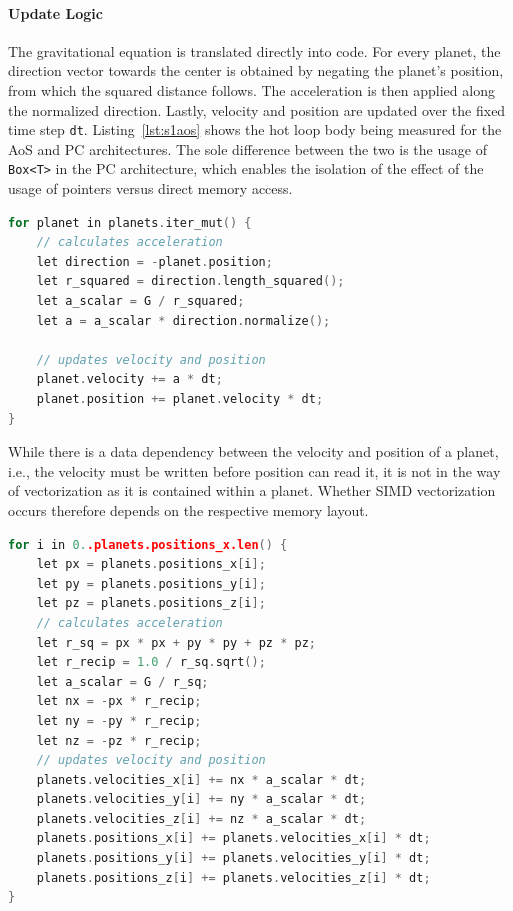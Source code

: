 \paragraph{Update Logic}
The gravitational equation is translated directly into code. For every planet, the direction vector towards the center is obtained by negating the planet's position, from which the squared distance follows. The acceleration is then applied along the normalized direction. Lastly, velocity and position are updated over the fixed time step \texttt{dt}. Listing~\ref{lst:s1aos} shows the hot loop body being measured for the \ac{AoS} and \ac{PC} architectures. The sole difference between the two is the usage of \texttt{Box<T>} in the \ac{PC} architecture, which enables the isolation of the effect of the usage of pointers versus direct memory access. 

\begin{lstlisting}[language=C++, caption={Update loop of the AoS and PC architectures}, label={lst:s1aos}]
for planet in planets.iter_mut() {
    // calculates acceleration
    let direction = -planet.position;
    let r_squared = direction.length_squared();
    let a_scalar = G / r_squared;
    let a = a_scalar * direction.normalize();

    // updates velocity and position
    planet.velocity += a * dt;
    planet.position += planet.velocity * dt;
}
\end{lstlisting}

While there is a data dependency between the velocity and position of a planet, i.e., the velocity must be written before position can read it, it is not in the way of vectorization as it is contained within a planet. Whether \ac{SIMD} vectorization occurs therefore depends on the respective memory layout. 

\clearpage
\begin{lstlisting}[language=C++, caption={Update loop of the SoA architecture}, label={lst:s1soa}]
for i in 0..planets.positions_x.len() {
    let px = planets.positions_x[i];
    let py = planets.positions_y[i];
    let pz = planets.positions_z[i];
    // calculates acceleration
    let r_sq = px * px + py * py + pz * pz;
    let r_recip = 1.0 / r_sq.sqrt();
    let a_scalar = G / r_sq;
    let nx = -px * r_recip;
    let ny = -py * r_recip;
    let nz = -pz * r_recip;
    // updates velocity and position
    planets.velocities_x[i] += nx * a_scalar * dt;
    planets.velocities_y[i] += ny * a_scalar * dt;
    planets.velocities_z[i] += nz * a_scalar * dt;
    planets.positions_x[i] += planets.velocities_x[i] * dt;
    planets.positions_y[i] += planets.velocities_y[i] * dt;
    planets.positions_z[i] += planets.velocities_z[i] * dt;
}
\end{lstlisting}

